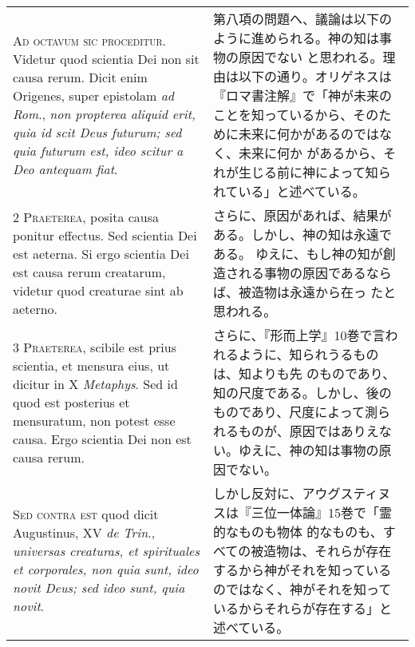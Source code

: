 \documentclass[10pt]{jsarticle} %
\begin{document}
\begin{longtable}{p{21em}p{21em}}

{\huge A}{\scshape d octavum sic proceditur}. Videtur quod scientia Dei
non sit causa rerum. Dicit enim Origenes, super epistolam {\itshape ad
Rom}., {\itshape non propterea aliquid erit, quia id scit Deus futurum;
sed quia futurum est, ideo scitur a Deo antequam fiat}.

&

第八項の問題へ、議論は以下のように進められる。神の知は事物の原因でない
と思われる。理由は以下の通り。オリゲネスは『ロマ書注解』で「神が未来の
ことを知っているから、そのために未来に何かがあるのではなく、未来に何か
があるから、それが生じる前に神によって知られている」と述べている。


\\


{\scshape 2 Praeterea}, posita causa ponitur
effectus. Sed scientia Dei est aeterna. Si ergo scientia Dei est causa
rerum creatarum, videtur quod creaturae sint ab aeterno.


&

さらに、原因があれば、結果がある。しかし、神の知は永遠である。
ゆえに、もし神の知が創造される事物の原因であるならば、被造物は永遠から在っ
 たと思われる。

\\


{\scshape 3 Praeterea}, scibile est prius scientia, et mensura eius, ut
dicitur in X {\itshape Metaphys}. Sed id quod est posterius et
mensuratum, non potest esse causa. Ergo scientia Dei non est causa
rerum.


&

さらに、『形而上学』10巻で言われるように、知られうるものは、知よりも先
のものであり、知の尺度である。しかし、後のものであり、尺度によって測ら
れるものが、原因ではありえない。ゆえに、神の知は事物の原因でない。

\\


{\scshape Sed contra est} quod dicit Augustinus, XV {\itshape de Trin}.,
{\itshape universas creaturas, et spirituales et corporales, non quia
sunt, ideo novit Deus; sed ideo sunt, quia novit}.


&

しかし反対に、アウグスティヌスは『三位一体論』15巻で「霊的なものも物体
的なものも、すべての被造物は、それらが存在するから神がそれを知っている
のではなく、神がそれを知っているからそれらが存在する」と述べている。


\\



\end{longtable}
\end{document}
